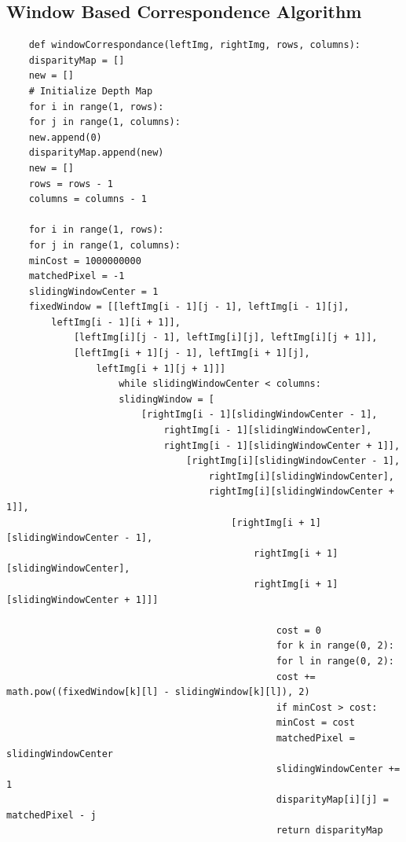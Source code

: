 \documentclass[11pt]{scrartcl}
\begin{document}
\subsection{Window Based Correspondence Algorithm}
\begin{verbatim}
	def windowCorrespondance(leftImg, rightImg, rows, columns):
	disparityMap = []
	new = []
	# Initialize Depth Map
	for i in range(1, rows):
	for j in range(1, columns):
	new.append(0)
	disparityMap.append(new)
	new = []
	rows = rows - 1
	columns = columns - 1
	
	for i in range(1, rows):
	for j in range(1, columns):
	minCost = 1000000000
	matchedPixel = -1
	slidingWindowCenter = 1
	fixedWindow = [[leftImg[i - 1][j - 1], leftImg[i - 1][j], 
		leftImg[i - 1][i + 1]],
			[leftImg[i][j - 1], leftImg[i][j], leftImg[i][j + 1]],
			[leftImg[i + 1][j - 1], leftImg[i + 1][j], 
				leftImg[i + 1][j + 1]]]
					while slidingWindowCenter < columns:
					slidingWindow = [
						[rightImg[i - 1][slidingWindowCenter - 1], 
							rightImg[i - 1][slidingWindowCenter],
							rightImg[i - 1][slidingWindowCenter + 1]],
								[rightImg[i][slidingWindowCenter - 1], 
									rightImg[i][slidingWindowCenter],
									rightImg[i][slidingWindowCenter + 1]],
										[rightImg[i + 1][slidingWindowCenter - 1], 
											rightImg[i + 1][slidingWindowCenter],
											rightImg[i + 1][slidingWindowCenter + 1]]]
												
												cost = 0
												for k in range(0, 2):
												for l in range(0, 2):
												cost += math.pow((fixedWindow[k][l] - slidingWindow[k][l]), 2)
												if minCost > cost:
												minCost = cost
												matchedPixel = slidingWindowCenter
												slidingWindowCenter += 1
												disparityMap[i][j] = matchedPixel - j
												return disparityMap
												\end{verbatim}
												\newpage
\end{document}
